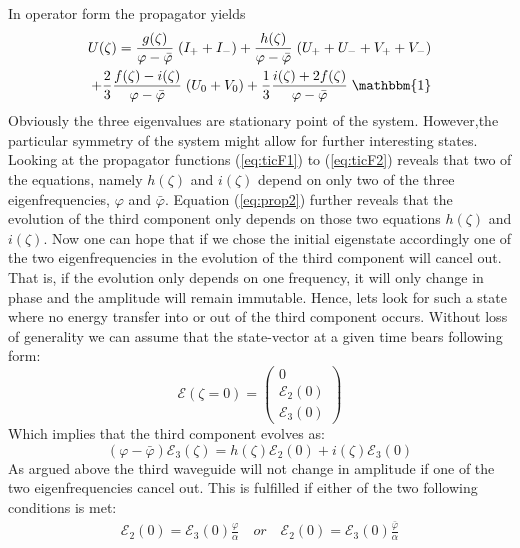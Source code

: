 \documentclass[9pt,twocolumn,twoside]{osajnl}
\begin{document}
In operator form the propagator yields
\begin{eqnarray}
U(\zeta)=\frac{g(\zeta)}{\varphi -\bar{\varphi}}\;(I_{+}+I_{-})
+\frac{h(\zeta)}{\varphi -\bar{\varphi}}\;(U_{+}+U_{-}+V_{+}+V_{-})
\nonumber\\
+\frac{2}{3}\frac{f(\zeta)-i(\zeta)}{\varphi -\bar{\varphi}}\;(U_{0}+V_{0})  
+\frac{1}{3}\frac{i(\zeta)+2f(\zeta)}{\varphi -\bar{\varphi}}\;\mathbbm{1}
\end{eqnarray}
\newline
Obviously the three eigenvalues are stationary point of the system. 
However,the particular symmetry of the system might allow for further
interesting states. \newline
Looking at the propagator functions (\ref{eq:ticF1}) to (\ref{eq:ticF2}) reveals that 
two of the equations, namely $h(\zeta)$ and $i(\zeta)$ depend on only two of the three
eigenfrequencies, $\varphi$ and $\bar{\varphi}$. Equation (\ref{eq:prop2}) further reveals that the 
evolution of the third component only depends on those two equations $h(\zeta)$ and $i(\zeta)$.
Now one can hope that if we chose the initial eigenstate accordingly one of the two 
eigenfrequencies in the evolution of the third component will cancel out. That is, if
the evolution only depends on one frequency, it will only change in phase and the 
amplitude will remain immutable. \newline
Hence, lets look for such a state where no energy transfer into or out of the third component occurs. Without loss of 
generality we can assume that the state-vector at a given time bears following form:
\begin{equation}
\mathcal{E}(\zeta=0)=\left( \begin{array}{c}
0 \\
\mathcal{E}_2(0) \\
\mathcal{E}_3(0)
\end{array} \right)	
\end{equation}   
Which implies that the third component evolves as:
\begin{equation}
(\varphi -\bar{\varphi})\mathcal{E}_3(\zeta) = h(\zeta)\mathcal{E}_2(0)
+i(\zeta)\mathcal{E}_3(0)
\end{equation}
As argued above the third waveguide will not change in amplitude if one of the 
two eigenfrequencies cancel out. This is fulfilled if either of the two following conditions
is met:
\begin{eqnarray}
\mathcal{E}_2(0)=\mathcal{E}_3(0)\frac{\varphi}{\alpha}\quad or \quad
\mathcal{E}_2(0)=\mathcal{E}_3(0)\frac{\bar{\varphi}}{\alpha}
\end{eqnarray}
\end{document}
